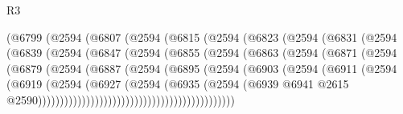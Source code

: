 \begin{lexlean}{R3}
\begin{coremodule}
                    (@6799
                      (@2594
                        (@6807
                          (@2594
                            (@6815
                              (@2594
                                (@6823
                                  (@2594
                                    (@6831
                                      (@2594
                                        (@6839
                                          (@2594
                                            (@6847
                                              (@2594
                                                (@6855
                                                  (@2594
                                                    (@6863
                                                      (@2594
                                                        (@6871
                                                          (@2594
                                                            (@6879
                                                              (@2594
                                                                (@6887
                                                                  (@2594
                                                                    (@6895
                                                                      (@2594
                                                                        (@6903
                                                                          (@2594
                                                                            (@6911
                                                                              (@2594
                                                                                (@6919
                                                                                  (@2594
                                                                                    (@6927
                                                                                      (@2594
                                                                                        (@6935
                                                                                          (@2594
                                                                                            (@6939
                                                                                              @6941
                                                                                              @2615
                                                                                              @2590)))))))))))))))))))))))))))))))))))))))))))))

\end{coremodule}
\end{lexlean}
